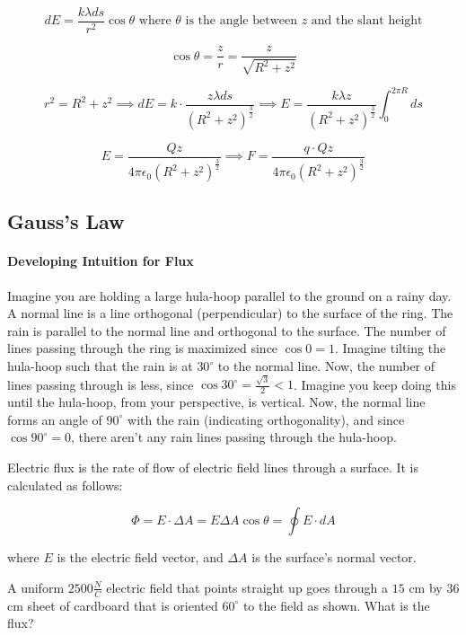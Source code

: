 \documentclass{scrartcl}
\theoremstyle{definition}
\begin{document}
	$$
	dE = \frac{k \lambda ds}{r^2} \cos \theta \text{ where $\theta$ is the angle between $z$ and the slant height}
	$$
	
	$$
	\cos \theta = \frac{z}{r} = \frac{z}{\sqrt{R^2+z^2}} 
	$$
	
	$$
	r^2 = R^2 + z^2 \implies dE = k \cdot \frac{z \lambda ds}{\left( R^2 + z^2 \right)^\frac{3}{2}} \implies E = \frac{k \lambda z}{\left( R^2 + z^2 \right)^\frac{3}{2}} \int_0^{2\pi R} ds
	$$
	
	$$
	E = \frac{Qz}{4\pi \epsilon_0 \left( R^2 + z^2 \right)^\frac{3}{2}} \implies F = \frac{q \cdot Qz}{4\pi \epsilon_0 \left( R^2 + z^2 \right)^\frac{3}{2}} 
	$$
	
	\subsection{Gauss's Law} 
	
	\paragraph{Developing Intuition for Flux} Imagine you are holding a large hula-hoop parallel to the ground on a rainy day. A normal line is a line orthogonal (perpendicular) to the surface of the ring. The rain is parallel to the normal line and orthogonal to the surface. The number of lines passing through the ring is maximized since $\cos 0 = 1$. Imagine tilting the hula-hoop such that the rain is at $30^\circ$ to the normal line. Now, the number of lines passing through is less, since $\cos 30^\circ = \frac{\sqrt{3}}{2} < 1$. Imagine you keep doing this until the hula-hoop, from your perspective, is vertical. Now, the normal line forms an angle of $90^\circ$ with the rain (indicating orthogonality), and since $\cos 90^\circ = 0$, there aren't any rain lines passing through the hula-hoop.
	
	\begin{theorem}[Flux]
		Electric flux is the rate of flow of electric field lines through a surface. It is calculated as follows:
		
		$$
		\Phi = E \cdot \Delta A = E \Delta A \cos \theta = \oint E \cdot dA
		$$
		
		\noindent where $E$ is the electric field vector, and $\Delta A$ is the surface's normal vector.
	\end{theorem}
	
	\begin{example}
		A uniform $2500 \frac{N}{C}$ electric field that points straight up goes through a $15$ cm by $36$ cm sheet of cardboard that is oriented $60^\circ$ to the field as shown. What is the flux?
	\end{example}
	
\end{document}
